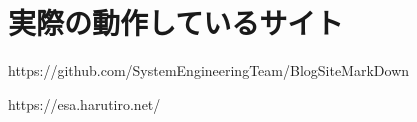\chapter{実際の動作しているサイト}

https://github.com/SystemEngineeringTeam/BlogSiteMarkDown

https://esa.harutiro.net/